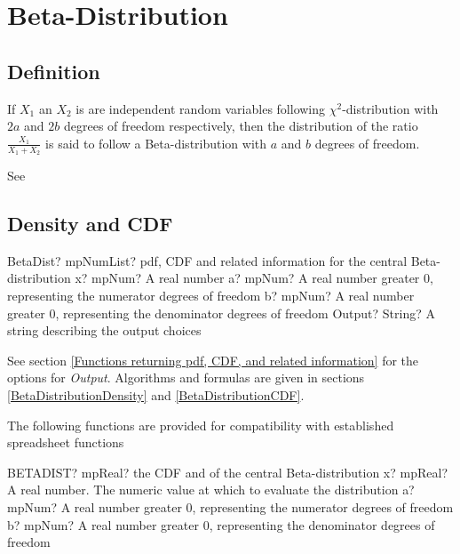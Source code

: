 \newpage
\section{Beta-Distribution}
\label{BetaDistribution}

\subsection{Definition}
\label{BetaDistributionDefinition}

If $X_1$ an $X_2$ is are independent random variables  following  $\chi^2$-distribution with $2a$ and $2b$ degrees of freedom respectively, 
then the distribution of the ratio $\frac{X_1}{X_1+X_2}$ is said to follow a Beta-distribution with  $a$ and $b$  degrees of freedom.

See \cite{Tretter_1979}


\subsection{Density and CDF}

\begin{mpFunctionsExtract}
	\mpFunctionFourNotImplemented
	{BetaDist? mpNumList? pdf, CDF and related information for the central Beta-distribution}
	{x? mpNum? A real number}
	{a? mpNum? A real number greater 0, representing the numerator  degrees of freedom}
	{b? mpNum? A real number greater 0, representing the denominator degrees of freedom}
	{Output? String? A string describing the output choices}
\end{mpFunctionsExtract}


\vspace{0.3cm}
See section \ref{Functions returning pdf, CDF, and related information} for the options for {\itshape\sffamily Output}. Algorithms and formulas are given in sections \ref{BetaDistributionDensity} and \ref{BetaDistributionCDF}.


\vspace{0.3cm}

The following functions are provided for compatibility with established spreadsheet functions

\vspace{0.3cm}
\begin{mpFunctionsExtract}
	\mpWorksheetFunctionThreeNotImplemented
	{BETADIST? mpReal? the CDF and of the central Beta-distribution}
	{x? mpReal? A real number. The numeric value at which to evaluate the distribution}
	{a? mpNum? A real number greater 0, representing the numerator  degrees of freedom}
	{b? mpNum? A real number greater 0, representing the denominator degrees of freedom}
\end{mpFunctionsExtract}

